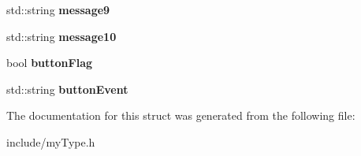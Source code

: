 \begin{DoxyCompactItemize}
\item 
\hypertarget{structmy_type_a0c9c2e5f664f25e9f469eef3b31b0eea}{
std::string {\bfseries message9}}
\label{structmy_type_a0c9c2e5f664f25e9f469eef3b31b0eea}

\item 
\hypertarget{structmy_type_a8c65f4564ff869a3110472471aa74af3}{
std::string {\bfseries message10}}
\label{structmy_type_a8c65f4564ff869a3110472471aa74af3}

\item 
\hypertarget{structmy_type_a510c8b9733a9b307ee7dc3006cca0549}{
bool {\bfseries buttonFlag}}
\label{structmy_type_a510c8b9733a9b307ee7dc3006cca0549}

\item 
\hypertarget{structmy_type_a0a9f0d2c290d5429476d1eada6c954bf}{
std::string {\bfseries buttonEvent}}
\label{structmy_type_a0a9f0d2c290d5429476d1eada6c954bf}

\end{DoxyCompactItemize}


The documentation for this struct was generated from the following file:\begin{DoxyCompactItemize}
\item 
include/myType.h\end{DoxyCompactItemize}
